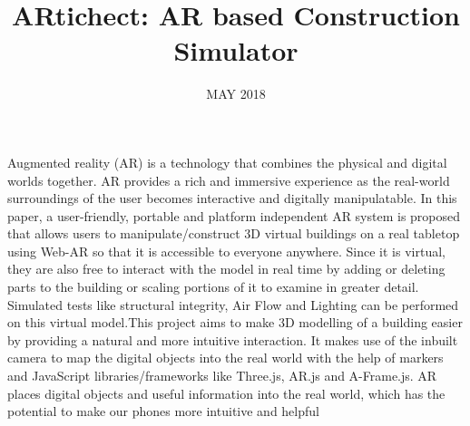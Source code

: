 \documentclass[BTech]{srmuthesis}
\begin{document}

\title{ARtichect: AR based Construction Simulator} %

\firstauthorregno{[Reg No: RA1511003020329]}
\secondauthorregno{[Reg No: RA1511003020359]}
\thirdauthorregno{[Reg No: RA1511003020332]}
\fourthauthorregno{[Reg No: RA1511003020384]}
\date{MAY 2018} %

\maketitle
\certificate






\abstract
\begin{doublespacing}
\large\noindent 
Augmented reality (AR) is a technology that combines the physical and digital worlds together. AR provides a rich and immersive experience as the real-world surroundings of the user becomes interactive and digitally manipulatable. In this paper, a user-friendly, portable and platform independent AR system   is proposed that allows users to manipulate/construct 3D virtual buildings on a real tabletop using Web-AR so that it is accessible to everyone anywhere. Since it is virtual, they are also free to interact with the model in real time by adding or deleting parts to the building or scaling portions of it to examine in greater detail. Simulated tests like structural integrity, Air Flow and Lighting can be performed on this virtual model.This project aims to make 3D modelling of a building easier by providing a natural and more intuitive interaction. It makes use of the inbuilt camera to map the digital objects into the real world with the help of markers and JavaScript libraries/frameworks like Three.js, AR.js and A-Frame.js. AR places digital objects and useful information into the real world, which has the potential to make our phones more intuitive and helpful\\
\end{doublespacing}
\end{document}
